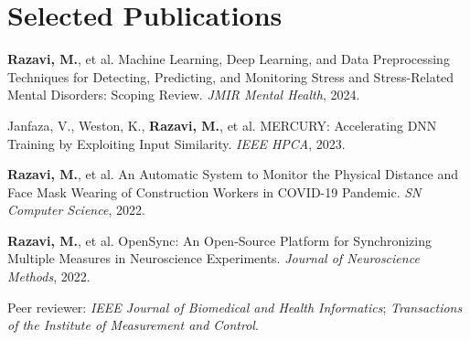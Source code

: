 \documentclass[letterpaper,10pt]{article}
\begin{document}
\section{Selected Publications}
\textbf{Razavi, M.}, et al. Machine Learning, Deep Learning, and Data Preprocessing Techniques for Detecting, Predicting, and Monitoring Stress and Stress-Related Mental Disorders: Scoping Review. \textit{JMIR Mental Health}, 2024.\par\vspace{1.5pt}
Janfaza, V., Weston, K., \textbf{Razavi, M.}, et al. MERCURY: Accelerating DNN Training by Exploiting Input Similarity. \textit{IEEE HPCA}, 2023.\par\vspace{1.5pt}
\textbf{Razavi, M.}, et al. An Automatic System to Monitor the Physical Distance and Face Mask Wearing of Construction Workers in COVID-19 Pandemic. \textit{SN Computer Science}, 2022.\par\vspace{1.5pt}
\textbf{Razavi, M.}, et al. OpenSync: An Open-Source Platform for Synchronizing Multiple Measures in Neuroscience Experiments. \textit{Journal of Neuroscience Methods}, 2022.\par\vspace{1.5pt}
Peer reviewer: \textit{IEEE Journal of Biomedical and Health Informatics}; \textit{Transactions of the Institute of Measurement and Control}.\par
\end{document}

